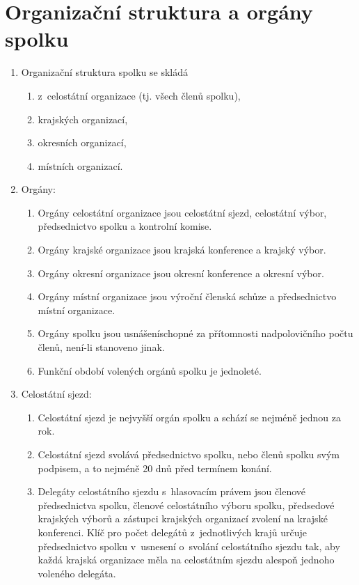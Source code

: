 \documentclass[a4paper]{article}
\begin{document}
\section{Organizační struktura a orgány spolku}
    \begin{enumerate}
    \item Organizační struktura spolku se skládá
        \begin{enumerate}
        \item z~celostátní organizace (tj. všech členů spolku),
        \item krajských organizací,
        \item okresních organizací,
        \item místních organizací.
        \end{enumerate}

    \item Orgány:
        \begin{enumerate}
        \item Orgány celostátní organizace jsou celostátní sjezd,
            celostátní výbor,
            předsednictvo spolku a kontrolní komise.
        \item Orgány krajské organizace jsou krajská konference a krajský
            výbor.
        \item Orgány okresní organizace jsou okresní konference a okresní výbor.
        \item Orgány místní organizace jsou výroční členská schůze a
            předsednictvo místní organizace.
        \item Orgány spolku jsou usnášeníschopné za přítomnosti nadpolovičního počtu
            členů, není-li stanoveno jinak.
        \item Funkční období volených orgánů spolku je jednoleté.
        \end{enumerate}

    \item Celostátní sjezd:
        \begin{enumerate}
        \item Celostátní sjezd je nejvyšší orgán spolku a schází se nejméně
            jednou za rok.

        \item Celostátní sjezd svolává předsednictvo spolku, nebo
             členů spolku svým podpisem, a to nejméně 20 dnů
            před termínem konání.

        \item Delegáty celostátního sjezdu s~hlasovacím právem jsou členové
            předsednictva spolku, členové celostátního výboru spolku,
            předsedové krajských výborů a zástupci
            krajských organizací zvolení na krajské konferenci. Klíč pro počet
            delegátů z~jednotlivých krajů určuje předsednictvo spolku
            v~usnesení o~svolání celostátního sjezdu tak, aby každá krajská
            organizace měla na celostátním sjezdu alespoň jednoho voleného
            delegáta.


\end{enumerate}
\end{enumerate}
\end{document}
